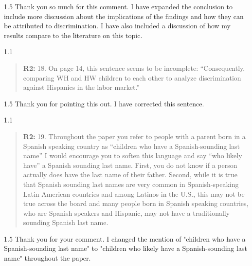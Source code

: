 \documentclass[12pt,english]{article}
\newcommand{\rrquote}{1.1}
\newcommand{\rrxspc}{1.5}
\begin{document}
\begin{refsection}
        \begin{spacing}{\rrxspc}
            Thank you so much for this comment. I have expanded the conclusion to include more discussion about the implications of the findings and how they can be attributed to discrimination. I have also included a discussion of how my results compare to the literature on this topic.
    \end{spacing}

    \begin{spacing}{\rrquote}
        \begin{quotation}
        \textbf{R2: } 18. On page 14, this sentence seems to be incomplete: “Consequently, comparing WH and HW children to each other to analyze discrimination against Hispanics in the labor market.”

              
        \end{quotation}
        \end{spacing}
        
        \begin{spacing}{\rrxspc}
            Thank you for pointing this out. I have corrected this sentence.
    \end{spacing}

    \begin{spacing}{\rrquote}
        \begin{quotation}
        \textbf{R2: } 19. Throughout the paper you refer to people with a parent born in a Spanish speaking country as “children who have a Spanish-sounding last name” I would encourage you to soften this language and say “who likely have” a Spanish sounding last name. First, you do not know if a person actually does have the last name of their father. Second, while it is true that Spanish sounding last names are very common in Spanish-speaking Latin American countries and among Latinos in the U.S., this may not be true across the board and many people born in Spanish speaking countries, who are Spanish speakers and Hispanic, may not have a traditionally sounding Spanish last name.
    
        \end{quotation}
        \end{spacing}
        
        \begin{spacing}{\rrxspc}
            Thank you for your comment. I changed the mention of "children who have a Spanish-sounding last name" to "children who likely have a Spanish-sounding last name" throughout the paper.
    \end{spacing}
    \end{refsection}
\end{document}
